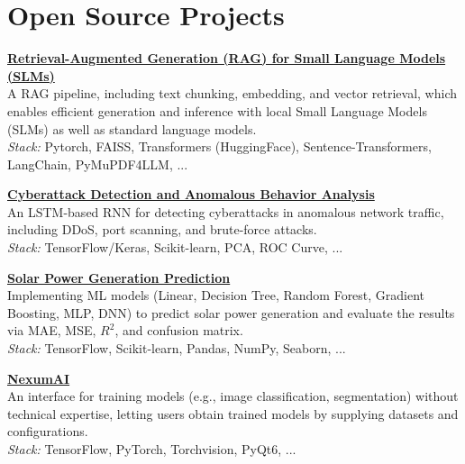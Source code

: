 \documentclass[letter,10pt]{article}
\begin{document}
\section*{Open Source Projects}
\begin{enumerate}[label={[\arabic*]}, nosep, leftmargin=*, itemsep=10pt]
    \item \href{https://github.com/AINexumLab/slm-rag/}{\textbf{ Retrieval-Augmented Generation (RAG) for Small Language Models (SLMs) }} \\
    A RAG pipeline, including text chunking, embedding, and vector retrieval, which enables efficient generation and inference with local Small Language Models (SLMs) as well as standard language models. \\[2.5pt]
    \textit{Stack:} Pytorch, FAISS, Transformers (HuggingFace), Sentence-Transformers, LangChain, PyMuPDF4LLM, ...


    \item \href{https://github.com/karami-mehdi/CyberattackDetection}{\textbf{ Cyberattack Detection and Anomalous Behavior Analysis }} \\
    An LSTM-based RNN for detecting cyberattacks in anomalous network traffic, including DDoS, port scanning, and brute-force attacks.\\[2.5pt]
    \textit{Stack:} TensorFlow/Keras, Scikit-learn, PCA, ROC Curve, ...

    \item \href{https://github.com/karami-mehdi/SolarPowerGenerationAnalysis}{\textbf{ Solar Power Generation Prediction }} \\
    Implementing ML models (Linear, Decision Tree, Random Forest, Gradient Boosting, MLP, DNN) to predict solar power generation and evaluate the results via MAE, MSE, $R^2$, and confusion matrix. \\[2.5pt]
    \textit{Stack:} TensorFlow, Scikit-learn, Pandas, NumPy, Seaborn, ...
    
    \item \href{https://github.com/AINexumLab/NexumAI}{\textbf{ NexumAI }} \\
    An interface for training models (e.g., image classification, segmentation) without technical expertise, letting users obtain trained models by supplying datasets and configurations. \\[2.5pt]
    \textit{Stack:} TensorFlow, PyTorch, Torchvision, PyQt6, ... \\[-7pt]
\end{enumerate}
\end{document}
